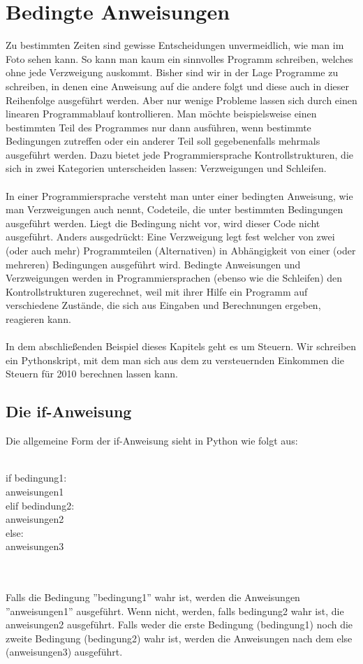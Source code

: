 \section{Bedingte Anweisungen}
Zu bestimmten Zeiten sind gewisse Entscheidungen unvermeidlich, wie man im Foto sehen kann. So kann man kaum ein sinnvolles Programm schreiben, welches ohne jede Verzweigung auskommt. Bisher sind wir in der Lage Programme zu schreiben, in denen eine Anweisung auf die andere folgt und diese auch in dieser Reihenfolge ausgeführt werden. Aber nur wenige Probleme lassen sich durch einen linearen Programmablauf kontrollieren. Man möchte beispielsweise einen bestimmten Teil des Programmes nur dann ausführen, wenn bestimmte Bedingungen zutreffen oder ein anderer Teil soll gegebenenfalls mehrmals ausgeführt werden. Dazu bietet jede Programmiersprache Kontrollstrukturen, die sich in zwei Kategorien unterscheiden lassen: Verzweigungen und Schleifen.\\
\\
In einer Programmiersprache versteht man unter einer bedingten Anweisung, wie man Verzweigungen auch nennt, Codeteile, die unter bestimmten Bedingungen ausgeführt werden. Liegt die Bedingung nicht vor, wird dieser Code nicht ausgeführt. Anders ausgedrückt: Eine Verzweigung legt fest welcher von zwei (oder auch mehr) Programmteilen (Alternativen) in Abhängigkeit von einer (oder mehreren) Bedingungen ausgeführt wird. Bedingte Anweisungen und Verzweigungen werden in Programmiersprachen (ebenso wie die Schleifen) den Kontrollstrukturen zugerechnet, weil mit ihrer Hilfe ein Programm auf verschiedene Zustände, die sich aus Eingaben und Berechnungen ergeben, reagieren kann.\\
\\
In dem abschließenden Beispiel dieses Kapitels geht es um Steuern. Wir schreiben ein Pythonskript, mit dem man sich aus dem zu versteuernden Einkommen die Steuern für 2010 berechnen lassen kann. 
\\
\subsection{Die if-Anweisung}
Die allgemeine Form der if-Anweisung sieht in Python wie folgt aus: \\
\\
\begin{MyConsoleBox}{
if bedingung1: \\
    anweisungen1 \\
elif bedindung2: \\
    anweisungen2 \\
else: \\
    anweisungen3 \\
}\end{MyConsoleBox}
\\ \\
Falls die Bedingung ''bedingung1'' wahr ist, werden die Anweisungen ''anweisungen1'' ausgeführt. Wenn nicht, werden, falls bedingung2 wahr ist, die anweisungen2 ausgeführt. Falls weder die erste Bedingung (bedingung1) noch die zweite Bedingung (bedingung2) wahr ist, werden die Anweisungen nach dem else (anweisungen3) ausgeführt. 
\\
